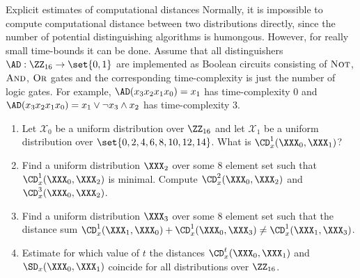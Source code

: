 \documentclass{crypto-exercise}
\author{Sven Laur}
\begin{document}
\begin{exercise}{Explicit estimates of computational distances}
Normally, it is impossible to compute computational distance between
two distributions directly, since the number of potential
distinguishing algorithms is humongous. However, for really small
time-bounds it can be done. Assume that all distinguishers
$\AD:\ZZ_{16}\to\set{0,1}$ are implemented as Boolean circuits
consisting of $\textsc{Not}$, $\textsc{And}$, $\textsc{Or}$ gates and
the corresponding time-complexity is just the number of logic
gates. For example, $\AD(x_3x_2x_1x_0)= x_1$ has time-complexity $0$
and $\AD(x_3x_2x_1x_0)= x_1\vee \neg x_3\wedge x_2$ has
time-complexity $3$.
\begin{enumerate}
   \item Let $\mathcal{X}_0$ be a uniform distribution over $\ZZ_{16}$
     and let $\mathcal{X}_1$ be a uniform distribution over
     $\set{0,2,4,6,8,10,12,14}$. What is $\CD_x^1(\XXX_0,\XXX_1)$?
   \item Find a uniform distribution $\XXX_2$ over some $8$ element
     set such that $\CD_x^1(\XXX_0,\XXX_2)$ is minimal. Compute
     $\CD_x^2(\XXX_0,\XXX_2)$ and $\CD_x^3(\XXX_0,\XXX_2)$.
   \item Find a uniform distribution $\XXX_3$ over some $8$ element
     set such that the distance sum $\CD_x^1(\XXX_1,\XXX_0)+
     \CD_x^1(\XXX_0,\XXX_3)\neq\CD_x^1(\XXX_1,\XXX_3)$.
   \item Estimate for which value of $t$ the distances
     $\CD_x^t(\XXX_0,\XXX_1)$ and $\SD_x(\XXX_0,\XXX_1)$ coincide for
     all distributions over $\ZZ_{16}$.
\end{enumerate}
\end{exercise}
\end{document}
